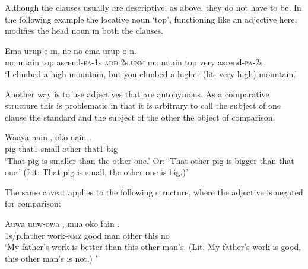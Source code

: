 Although the clauses usually are descriptive, as above, they do not have to be. In the following example the locative noun  `top', functioning like an adjective here, modifies the head noun in both the clauses.  

\ea%
\label{ex:x1324}
\gll Ema   urup-e-m,  ne  no  ema     urup-o-n.\\
mountain  top  ascend-\textsc{pa}-1s  \textsc{add}  2s.\textsc{unm}  mountain top  very  ascend-\textsc{pa}-2s\\
\glt `I climbed a high mountain, but you climbed a higher (lit: very high) mountain.'
\z

Another way is to use adjectives that are antonymous. As a comparative structure this is problematic in that it is arbitrary to call the subject of one clause the standard and the subject of the other the object of comparison. 

\ea%
\label{ex:x1325}
\gll Waaya  nain  ,  oko  nain  . \\
pig  that1  small  other  that1  big\\
\glt `That pig is smaller than the other one.' Or: `That other pig is bigger than that one.' (Lit: That pig is small, the other one is big.)'
\z

The same caveat applies to the following structure, where the adjective is negated for comparison:

\ea%

\label{ex:x1326}
\gll Auwa  uuw-owa  ,  mua  oko  fain  . \\
1s/p.father  work-\textsc{nmz}  good  man  other  this  no\\
\glt `My father's work is better than this other man's. (Lit: My father's work is good, this other man's is not.) '
\z

